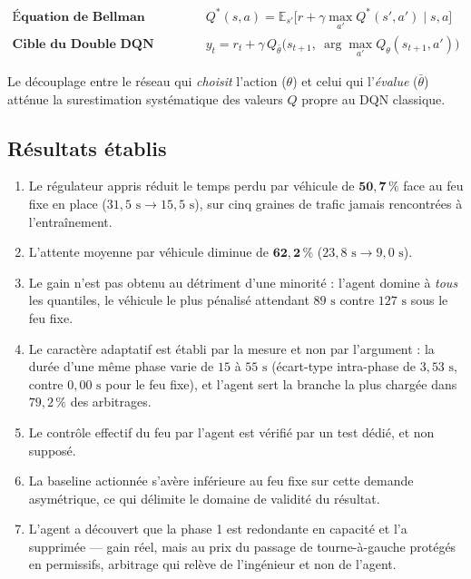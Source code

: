 \documentclass[11pt,a4paper]{article}
\begin{document}
\begin{align}
  \textbf{Équation de Bellman optimale} \quad & Q^{*}(s,a)=\mathbb{E}_{s'}\bigl[ r + \gamma \max_{a'} Q^{*}(s',a') \mid s,a\bigr] \\
  \textbf{Cible du Double DQN} \quad & y_t = r_t + \gamma\, Q_{\bar\theta}\bigl(s_{t+1},\ \arg\max_{a'} Q_{\theta}(s_{t+1},a')\bigr)
\end{align}

Le découplage entre le réseau qui \emph{choisit} l'action ($\theta$) et celui qui
l'\emph{évalue} ($\bar\theta$) atténue la surestimation systématique des valeurs $Q$
propre au DQN classique.

\subsection{Résultats établis}

\begin{enumerate}
    \item Le régulateur appris réduit le temps perdu par véhicule de
          $\mathbf{50{,}7\,\%}$ face au feu fixe en place
          ($31{,}5\text{ s} \rightarrow 15{,}5\text{ s}$), sur cinq graines de trafic
          jamais rencontrées à l'entraînement.
    \item L'attente moyenne par véhicule diminue de $\mathbf{62{,}2\,\%}$
          ($23{,}8\text{ s} \rightarrow 9{,}0\text{ s}$).
    \item Le gain n'est pas obtenu au détriment d'une minorité : l'agent domine à
          \emph{tous} les quantiles, le véhicule le plus pénalisé attendant
          $89\text{ s}$ contre $127\text{ s}$ sous le feu fixe.
    \item Le caractère adaptatif est établi par la mesure et non par l'argument : la
          durée d'une même phase varie de $15$ à $55\text{ s}$ (écart-type intra-phase
          de $3{,}53\text{ s}$, contre $0{,}00\text{ s}$ pour le feu fixe), et l'agent
          sert la branche la plus chargée dans $79{,}2\,\%$ des arbitrages.
    \item Le contrôle effectif du feu par l'agent est vérifié par un test dédié, et
          non supposé.
    \item La baseline actionnée s'avère inférieure au feu fixe sur cette demande
          asymétrique, ce qui délimite le domaine de validité du résultat.
    \item L'agent a découvert que la phase 1 est redondante en capacité et l'a
          supprimée --- gain réel, mais au prix du passage de tourne-à-gauche protégés
          en permissifs, arbitrage qui relève de l'ingénieur et non de l'agent.
\end{enumerate}
\end{document}
